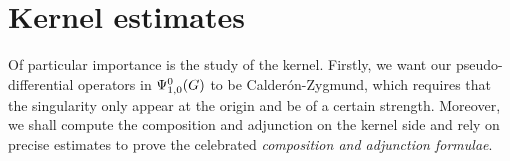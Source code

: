 
\section{Kernel estimates}

Of particular importance is the study of the kernel.
Firstly, we want our pseudo-differential operators in $\Psi^{0}_{1, 0}(G)$ to be Calder\'on-Zygmund,
which requires that the singularity only appear at the origin and be of a certain strength.
Moreover,
we shall compute the composition and adjunction on the kernel side
and rely on precise estimates to prove the celebrated \emph{composition and adjunction formulae}.

%

